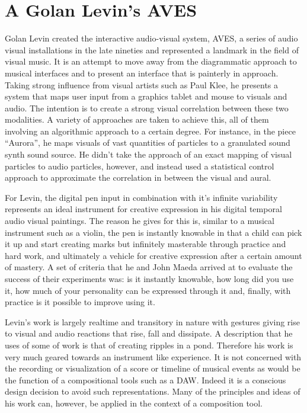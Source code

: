 \documentclass[12pt]{report}
\begin{document}
\section{A Golan Levin's AVES}
\label{sec:orgaf7560a}
Golan Levin created the interactive audio-visual system, AVES, a series of audio
visual installations in the late nineties and represented a landmark in the
field of visual music. It is an attempt to move away from the diagrammatic
approach to musical interfaces and to present an interface that is painterly in
approach. Taking strong influence from visual artists such as Paul Klee, he
presents a system that maps user input from a graphics tablet and mouse to
visuals and audio. The intention is to create a strong visual correlation
between these two modalities. A variety of approaches are taken to achieve this,
all of them involving an algorithmic approach to a certain degree. For instance,
in the piece ``Aurora'', he maps visuals of vast quantities of particles to a
granulated sound synth sound source. He didn't take the approach of an exact
mapping of visual particles to audio particles, however, and instead used a
statistical control approach to approximate the correlation in between the
visual and aural. \cite{levin_painterly_2000}

For Levin, the digital pen input in combination with it's infinite variability
represents an ideal instrument for creative expression in his digital temporal
audio visual paintings. \cite{levin_painterly_2000} The reason he gives for this
is, similar to a musical instrument such as a violin, the pen is instantly
knowable in that a child can pick it up and start creating marks but infinitely
masterable through practice and hard work, and ultimately a vehicle for creative
expression after a certain amount of mastery. A set of criteria that he and John
Maeda arrived at to evaluate the success of their experiments was: is it
instantly knowable, how long did you use it, how much of your personality can be
expressed through it and, finally, with practice is it possible to improve using
it.

Levin's work is largely realtime and transitory in nature with gestures giving
rise to visual and audio reactions that rise, fall and dissipate. A description
that he uses of some of work is that of creating ripples in a pond. Therefore
his work is very much geared towards an instrument like experience. It is not
concerned with the recording or visualization of a score or timeline of musical
events as would be the function of a compositional tools such as a DAW. Indeed
it is a conscious design decision to avoid such representations. Many of the
principles and ideas of his work can, however, be applied in the context of a
composition tool.
\end{document}
